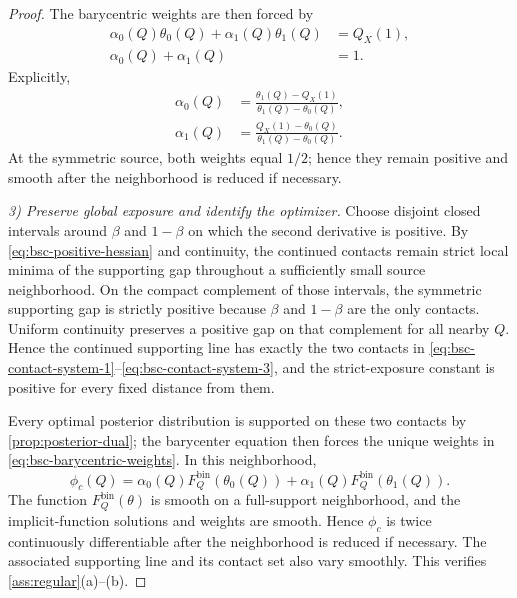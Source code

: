 \documentclass[10pt,a4paper]{amsart}
\begin{document}
\begin{proof}
The barycentric weights are then forced by
\begin{align}
\alpha_0(Q)\theta_0(Q)+\alpha_1(Q)\theta_1(Q)&=Q_X(1),\\
\alpha_0(Q)+\alpha_1(Q)&=1.
\end{align}
Explicitly,
\begin{align}
\alpha_0(Q)
&=\frac{\theta_1(Q)-Q_X(1)}{\theta_1(Q)-\theta_0(Q)},\\
\alpha_1(Q)
&=\frac{Q_X(1)-\theta_0(Q)}{\theta_1(Q)-\theta_0(Q)}.
\label{eq:bsc-barycentric-weights}
\end{align}
At the symmetric source, both weights equal $1/2$; hence they remain positive and smooth after the neighborhood is reduced if necessary.

\emph{3) Preserve global exposure and identify the optimizer.}
Choose disjoint closed intervals around $\beta$ and $1-\beta$ on which the second derivative is positive.  By \eqref{eq:bsc-positive-hessian} and continuity, the continued contacts remain strict local minima of the supporting gap throughout a sufficiently small source neighborhood.  On the compact complement of those intervals, the symmetric supporting gap is strictly positive because $\beta$ and $1-\beta$ are the only contacts.  Uniform continuity preserves a positive gap on that complement for all nearby $Q$.  Hence the continued supporting line has exactly the two contacts in \eqref{eq:bsc-contact-system-1}--\eqref{eq:bsc-contact-system-3}, and the strict-exposure constant is positive for every fixed distance from them.

Every optimal posterior distribution is supported on these two contacts by \cref{prop:posterior-dual}; the barycenter equation then forces the unique weights in \eqref{eq:bsc-barycentric-weights}.  In this neighborhood,
\begin{equation}
\phi_c(Q)=\alpha_0(Q)F_Q^{\mathrm{bin}}(\theta_0(Q))
+\alpha_1(Q)F_Q^{\mathrm{bin}}(\theta_1(Q)).
\end{equation}
The function $F_Q^{\mathrm{bin}}(\theta)$ is smooth on a full-support neighborhood, and the implicit-function solutions and weights are smooth.  Hence $\phi_c$ is twice continuously differentiable after the neighborhood is reduced if necessary.  The associated supporting line and its contact set also vary smoothly.  This verifies \cref{ass:regular}(a)--(b).
\end{proof}
\end{document}
